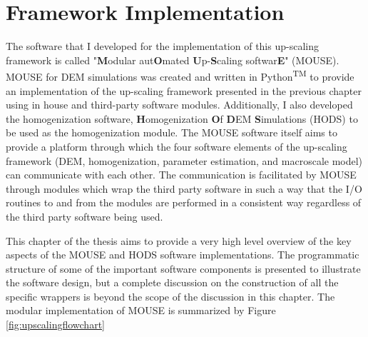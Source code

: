 \chapter{Framework Implementation}

The software that I developed for the implementation of this up-scaling framework is called "\textbf{M}odular aut\textbf{O}mated \textbf{U}p-\textbf{S}caling softwar\textbf{E}" (MOUSE). MOUSE for DEM simulations was created and written in Python\textsuperscript{TM} to provide an implementation of the up-scaling framework presented in the previous chapter using in house and third-party software modules. Additionally, I also developed the homogenization software, \textbf{H}omogenization \textbf{O}f \textbf{D}EM \textbf{S}imulations (HODS) to be used as the homogenization module. The MOUSE software itself aims to provide a platform through which the four software elements of the up-scaling framework (DEM, homogenization, parameter estimation, and macroscale model) can communicate with each other. The communication is facilitated by MOUSE through modules which wrap the third party software in such a way that the I/O routines to and from the modules are performed in a consistent way regardless of the third party software being used. 

This chapter of the thesis aims to provide a very high level overview of the key aspects of the MOUSE and HODS software implementations. The programmatic structure of some of the important software components is presented to illustrate the software design, but a complete discussion on the construction of all the specific wrappers is beyond the scope of the discussion in this chapter. The modular implementation of MOUSE is summarized by Figure \ref{fig:upscalingflowchart}

